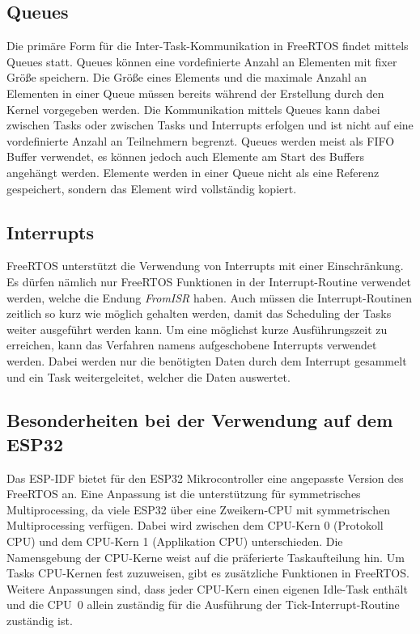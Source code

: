 \subsection{Queues}
Die primäre Form für die Inter-Task-Kommunikation in FreeRTOS findet mittels Queues statt. Queues können eine vordefinierte Anzahl an Elementen mit fixer Größe speichern. Die Größe eines Elements und die maximale Anzahl an Elementen in einer Queue müssen bereits während der Erstellung durch den Kernel vorgegeben werden. Die Kommunikation mittels Queues kann dabei zwischen Tasks oder zwischen Tasks und Interrupts erfolgen und ist nicht auf eine vordefinierte Anzahl an Teilnehmern begrenzt. Queues werden meist als \ac{FIFO} Buffer verwendet, es können jedoch auch Elemente am Start des Buffers angehängt werden. Elemente werden in einer Queue nicht als eine Referenz gespeichert, sondern das Element wird vollständig kopiert. \cites[S.~104ff.]{barryFreeRTOS}{freeRTOSQueues}

\subsection{Interrupts}
FreeRTOS unterstützt die Verwendung von Interrupts mit einer Einschränkung. Es dürfen nämlich nur FreeRTOS Funktionen in der Interrupt-Routine verwendet werden, welche die Endung \textit{FromISR} haben. Auch müssen die Interrupt-Routinen zeitlich so kurz wie möglich gehalten werden, damit das Scheduling der Tasks weiter ausgeführt werden kann. Um eine möglichst kurze Ausführungszeit zu erreichen, kann das Verfahren namens aufgeschobene Interrupts verwendet werden. Dabei werden nur die benötigten Daten durch dem Interrupt gesammelt und ein Task weitergeleitet, welcher die Daten auswertet. \cites[S.~185]{barryFreeRTOS}[S.~195]{barryFreeRTOS}

\subsection{Besonderheiten bei der Verwendung auf dem ESP32}
Das \ac{ESP-IDF} bietet für den ESP32 Mikrocontroller eine angepasste Version des FreeRTOS an. Eine Anpassung ist die unterstützung für symmetrisches Multiprocessing, da viele ESP32 über eine Zweikern-\acs{CPU} mit symmetrischen Multiprocessing verfügen. Dabei wird zwischen dem \acs{CPU}-Kern 0 (Protokoll \acs{CPU}) und dem \acs{CPU}-Kern 1 (Applikation \acs{CPU}) unterschieden. Die Namensgebung der \acs{CPU}-Kerne weist auf die präferierte Taskaufteilung hin. Um Tasks \acs{CPU}-Kernen fest zuzuweisen, gibt es zusätzliche Funktionen in FreeRTOS. Weitere Anpassungen sind, dass jeder {CPU}-Kern einen eigenen Idle-Task enthält und die \acs{CPU}~0 allein zuständig für die Ausführung der Tick-Interrupt-Routine zuständig ist. \cites{espressifSMP}{espressifFreeRTOS}

